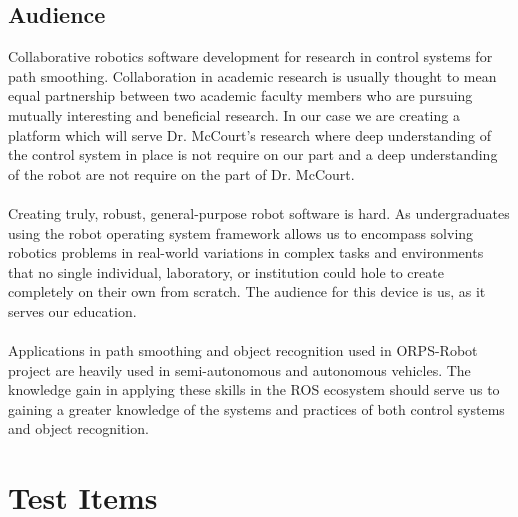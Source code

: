 \documentclass[english,12pt]{article}
\begin{document}
\subsection{Audience}
Collaborative robotics software development for research in control systems 
for path smoothing. Collaboration in academic research is usually thought to mean 
equal partnership between two academic faculty members who are pursuing mutually 
interesting and beneficial research. In our case we are creating a platform which 
will serve Dr. McCourt's research where deep understanding of the control system in 
place is not require on our part and a deep understanding of the robot are not 
require on the part of Dr. McCourt.\\\\
Creating truly, robust, general-purpose robot software is hard. As 
undergraduates using the robot operating system framework allows us to encompass 
solving robotics problems in real-world variations in complex tasks and 
environments that no single individual, laboratory, or institution could 
hole to create completely on their own from scratch. The audience for this 
device is us, as it serves our education.\\\\
Applications in path smoothing and object recognition used in 
ORPS-Robot project are heavily used in semi-autonomous and autonomous 
vehicles. The knowledge gain in applying these skills in the ROS ecosystem 
should serve us to gaining a greater knowledge of the systems and 
practices of both control systems and object recognition.
\section{Test Items}
\end{document}
